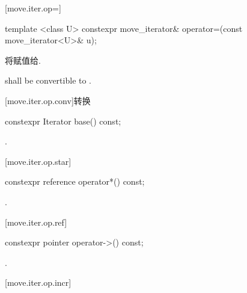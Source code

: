 [move.iter.op=]{}

%
%
\begin{itemdecl}
template <class U> constexpr move_iterator& operator=(const move_iterator<U>& u);
\end{itemdecl}

\begin{itemdescr}
\pnum
\effects 将赋值给.

\pnum
\requires {} shall be convertible to
.
\end{itemdescr}

[move.iter.op.conv]{转换}

%
%
\begin{itemdecl}
constexpr Iterator base() const;
\end{itemdecl}

\begin{itemdescr}
\pnum
\returns {}.
\end{itemdescr}

[move.iter.op.star]{}

%
%
\begin{itemdecl}
constexpr reference operator*() const;
\end{itemdecl}

\begin{itemdescr}
\pnum
\returns {}.
\end{itemdescr}

[move.iter.op.ref]{}

%
%
\begin{itemdecl}
constexpr pointer operator->() const;
\end{itemdecl}

\begin{itemdescr}
\pnum
\returns {}.
\end{itemdescr}

[move.iter.op.incr]{}

